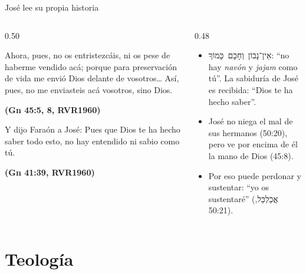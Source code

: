 \documentclass[hyperref={bookmarks=false},aspectratio=169]{beamer}
\newcommand{\heb}[1]{\mbox{\foreignlanguage{hebrew}{#1}}}
\newcommand{\fuente}[1]{\par\hfill{\upshape\bfseries\footnotesize\textcolor{azul}{#1}}}
\begin{document}
\begin{frame}{José lee su propia historia}
\begin{columns}[t,onlytextwidth]
\begin{column}{0.50\textwidth}
\begin{cita}Ahora, pues, no os entristezcáis, ni os pese de haberme vendido acá; porque para preservación de vida me envió Dios delante de vosotros\ldots{} Así, pues, no me enviasteis acá vosotros, sino Dios.\fuente{(Gn 45:5, 8, RVR1960)}\end{cita}
\begin{cita}Y dijo Faraón a José: Pues que Dios te ha hecho saber todo esto, no hay entendido ni sabio como tú.\fuente{(Gn 41:39, RVR1960)}\end{cita}
\end{column}
\begin{column}{0.48\textwidth}\small
\begin{itemize}
\item \heb{אֵין־נָבוֹן וְחָכָם כָּמוֹךָ}: ``no hay \emph{navón} y \emph{jajam} como tú''. La sabiduría de José es recibida: ``Dios te ha hecho saber''.
\item José no niega el mal de sus hermanos (50:20), pero ve por encima de él la mano de Dios (45:8).
\item Por eso puede perdonar y sustentar: ``yo os sustentaré'' (\heb{אֲכַלְכֵּל}, 50:21).
\end{itemize}
\end{column}
\end{columns}
\end{frame}

\section{Teología}
\end{document}
